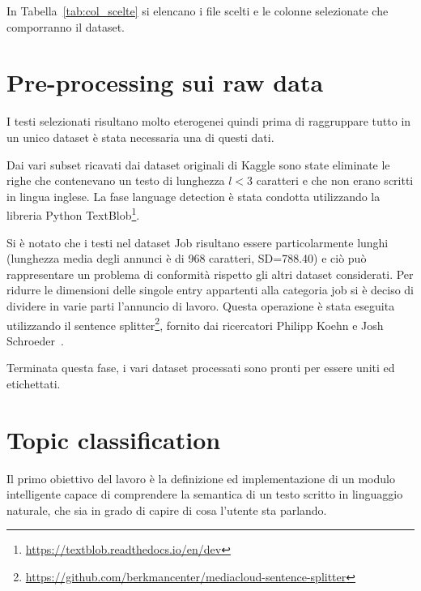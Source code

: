 In Tabella~\ref{tab:col_scelte} si elencano i file scelti e le colonne selezionate che comporranno il dataset.

\section{Pre-processing sui raw data}
\label{sec:preprocessingraw}
I testi selezionati risultano molto eterogenei quindi prima di raggruppare tutto in un unico dataset è stata necessaria una  di questi dati.

Dai vari subset ricavati dai dataset originali di Kaggle sono state eliminate le righe che contenevano un testo di lunghezza $l<3$ caratteri e che non erano scritti in lingua inglese. La fase language detection è stata condotta utilizzando la libreria Python  TextBlob\footnote{\url{https://textblob.readthedocs.io/en/dev}}.

Si è notato che i testi nel dataset Job risultano essere particolarmente lunghi (lunghezza media degli annunci è di 968 caratteri, SD=788.40) e ciò può rappresentare un problema di conformità rispetto gli altri dataset considerati. Per ridurre le dimensioni delle singole entry appartenti alla categoria job si è deciso di dividere in varie parti l'annuncio di lavoro. Questa operazione è stata eseguita utilizzando il sentence splitter\footnote{\url{https://github.com/berkmancenter/mediacloud-sentence-splitter}}, fornito dai ricercatori Philipp Koehn e Josh Schroeder~\cite{Koehn07}. 

Terminata questa fase, i vari dataset processati sono pronti per essere uniti ed etichettati.

\section{Topic classification}
\label{sec:topicclass}
Il primo obiettivo del lavoro è la definizione ed implementazione di un modulo intelligente capace di comprendere la semantica di un testo scritto in linguaggio naturale, che sia in grado di capire di cosa l'utente sta parlando.

